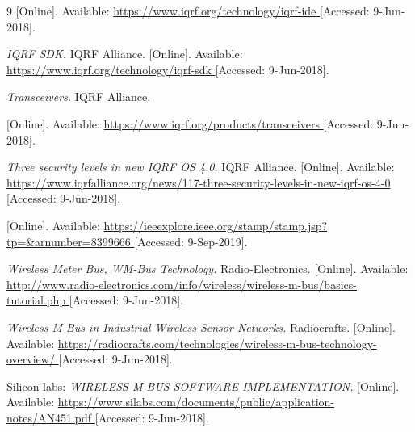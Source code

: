 \begin{thebibliography}{9}
[Online]. Available:
\url{
https://www.iqrf.org/technology/iqrf-ide
}
[Accessed: 9-Jun-2018].




\textit{
IQRF SDK.
}
IQRF Alliance.
[Online]. Available:
\url{
https://www.iqrf.org/technology/iqrf-sdk
}
[Accessed: 9-Jun-2018].



\textit{
Transceivers.
}
IQRF Alliance.

[Online]. Available:
\url{
https://www.iqrf.org/products/transceivers
}
[Accessed: 9-Jun-2018].


\textit{
Three security levels in new IQRF OS 4.0.
}
IQRF Alliance.
[Online]. Available:
\url{
https://www.iqrfalliance.org/news/117-three-security-levels-in-new-iqrf-os-4-0
}
[Accessed: 9-Jun-2018].



[Online]. Available:
\url{
https://ieeexplore.ieee.org/stamp/stamp.jsp?tp=&arnumber=8399666
}
[Accessed: 9-Sep-2019].




\textit{
Wireless Meter Bus, WM-Bus Technology.
}
Radio-Electronics.
[Online]. Available:
\url{
http://www.radio-electronics.com/info/wireless/wireless-m-bus/basics-tutorial.php
}
[Accessed: 9-Jun-2018].


\textit{
Wireless M-Bus in Industrial Wireless Sensor Networks.
}
Radiocrafts.
[Online]. Available:
\url{
https://radiocrafts.com/technologies/wireless-m-bus-technology-overview/
}
[Accessed: 9-Jun-2018].




Silicon labs: 
\textit{
WIRELESS M-BUS SOFTWARE IMPLEMENTATION.
}
[Online]. Available:
\url{
https://www.silabs.com/documents/public/application-notes/AN451.pdf
}
[Accessed: 9-Jun-2018].


\end{thebibliography}
